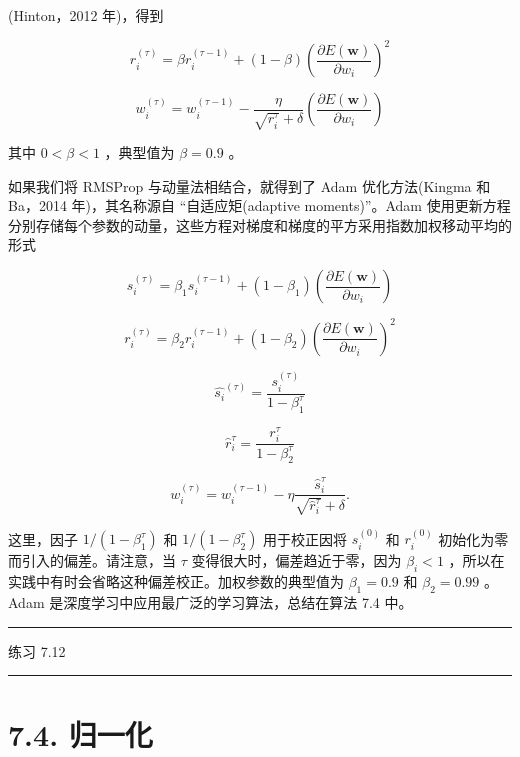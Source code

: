 \documentclass[10pt]{article}
\newcommand{\HRule}{\begin{center}\rule{0.9\linewidth}{0.2mm}\end{center}}
\begin{document}
(Hinton，2012 年)，得到

\[
{r}_{i}^{\left( \tau \right) } = \beta {r}_{i}^{\left( \tau  - 1\right) } + \left( {1 - \beta }\right) {\left( \frac{\partial E\left( \mathbf{w}\right) }{\partial {w}_{i}}\right) }^{2} \tag{7.41}
\]

\[
{w}_{i}^{\left( \tau \right) } = {w}_{i}^{\left( \tau  - 1\right) } - \frac{\eta }{\sqrt{{r}_{i}^{\tau }} + \delta }\left( \frac{\partial E\left( \mathbf{w}\right) }{\partial {w}_{i}}\right)  \tag{7.42}
\]

其中 \(0 < \beta  < 1\) ，典型值为 \(\beta  = {0.9}\) 。

如果我们将 RMSProp 与动量法相结合，就得到了 Adam 优化方法(Kingma 和 Ba，2014 年)，其名称源自 “自适应矩(adaptive moments)”。Adam 使用更新方程分别存储每个参数的动量，这些方程对梯度和梯度的平方采用指数加权移动平均的形式

\[
{s}_{i}^{\left( \tau \right) } = {\beta }_{1}{s}_{i}^{\left( \tau  - 1\right) } + \left( {1 - {\beta }_{1}}\right) \left( \frac{\partial E\left( \mathbf{w}\right) }{\partial {w}_{i}}\right)  \tag{7.43}
\]

\[
{r}_{i}^{\left( \tau \right) } = {\beta }_{2}{r}_{i}^{\left( \tau  - 1\right) } + \left( {1 - {\beta }_{2}}\right) {\left( \frac{\partial E\left( \mathbf{w}\right) }{\partial {w}_{i}}\right) }^{2} \tag{7.44}
\]

\[
{\widehat{{s}_{i}}}^{\left( \tau \right) } = \frac{{s}_{i}^{\left( \tau \right) }}{1 - {\beta }_{1}^{\tau }} \tag{7.45}
\]

\[
{\widehat{r}}_{i}^{\tau } = \frac{{r}_{i}^{\tau }}{1 - {\beta }_{2}^{\tau }} \tag{7.46}
\]

\[
{w}_{i}^{\left( \tau \right) } = {w}_{i}^{\left( \tau  - 1\right) } - \eta \frac{{\widehat{s}}_{i}^{\tau }}{\sqrt{{\widehat{r}}_{i}^{\tau }} + \delta }. \tag{7.47}
\]

这里，因子 \(1/\left( {1 - {\beta }_{1}^{\tau }}\right)\) 和 \(1/\left( {1 - {\beta }_{2}^{\tau }}\right)\) 用于校正因将 \({s}_{i}^{\left( 0\right) }\) 和 \({r}_{i}^{\left( 0\right) }\) 初始化为零而引入的偏差。请注意，当 \(\tau\) 变得很大时，偏差趋近于零，因为 \({\beta }_{i} < 1\) ，所以在实践中有时会省略这种偏差校正。加权参数的典型值为 \({\beta }_{1} = {0.9}\) 和 \({\beta }_{2} = {0.99}\) 。Adam 是深度学习中应用最广泛的学习算法，总结在算法 7.4 中。

\HRule

练习 7.12

\HRule

\section*{7.4. 归一化}
\end{document}
